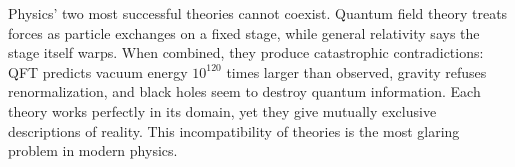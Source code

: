 Physics' two most successful theories cannot coexist. Quantum field theory treats forces as particle exchanges on a fixed stage, while general relativity says the stage itself warps. When combined, they produce catastrophic contradictions: QFT predicts vacuum energy $10^{120}$ times larger than observed, gravity refuses renormalization, and black holes seem to destroy quantum information. Each theory works perfectly in its domain, yet they give mutually exclusive descriptions of reality. This incompatibility of theories is the most glaring problem in modern physics.
